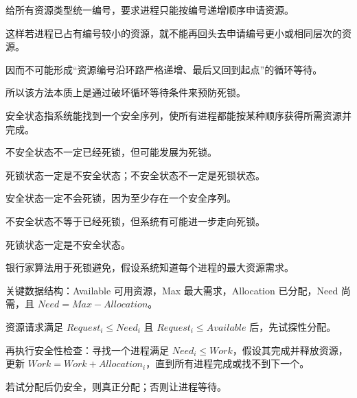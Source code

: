 \begin{points}
  \item 给所有资源类型统一编号，要求进程只能按编号递增顺序申请资源。
  \item 这样若进程已占有编号较小的资源，就不能再回头去申请编号更小或相同层次的资源。
  \item 因而不可能形成“资源编号沿环路严格递增、最后又回到起点”的循环等待。
  \item 所以该方法本质上是通过破坏循环等待条件来预防死锁。
\end{points}


\begin{points}
  \item 安全状态指系统能找到一个安全序列，使所有进程都能按某种顺序获得所需资源并完成。
  \item 不安全状态不一定已经死锁，但可能发展为死锁。
  \item 死锁状态一定是不安全状态；不安全状态不一定是死锁状态。
\end{points}


\begin{points}
  \item 安全状态一定不会死锁，因为至少存在一个安全序列。
  \item 不安全状态不等于已经死锁，但系统有可能进一步走向死锁。
  \item 死锁状态一定是不安全状态。
\end{points}


\begin{points}
  \item 银行家算法用于死锁避免，假设系统知道每个进程的最大资源需求。
  \item 关键数据结构：Available 可用资源，Max 最大需求，Allocation 已分配，Need 尚需，且 $Need=Max-Allocation$。
  \item 资源请求满足 $Request_i\le Need_i$ 且 $Request_i\le Available$ 后，先试探性分配。
  \item 再执行安全性检查：寻找一个进程满足 $Need_i\le Work$，假设其完成并释放资源，更新 $Work=Work+Allocation_i$，直到所有进程完成或找不到下一个。
  \item 若试分配后仍安全，则真正分配；否则让进程等待。
\end{points}


